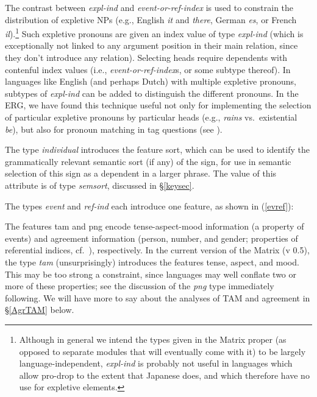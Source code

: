 \documentclass[12pt]{article}
\newcommand{\ees}{\eenumsentence}
\begin{document}
The contrast between {\it expl-ind} and {\it event-or-ref-index} is
used to constrain the distribution of expletive NPs (e.g., English
{\it it} and {\it there}, German {\it es}, or French {\it
il}).\footnote{Although in general we intend the types given in the
Matrix proper (as opposed to separate modules that will eventually
come with it) to be largely language-independent, 
{\it expl-ind} is probably not useful in languages
which allow pro-drop to the extent that Japanese does, and which therefore
have no use for expletive elements.}  Such expletive pronouns are given
an {\sc index} value of type {\it expl-ind} (which is exceptionally not
linked to any argument position in their main relation, since they
don't introduce any relation).  Selecting heads require dependents with
contenful {\sc index} values (i.e., {\it event-or-ref-index}s, or
some subtype thereof).  In languages like English (and perhaps Dutch) with
multiple expletive pronouns, subtypes of {\it expl-ind} can be added
to distinguish the different pronouns.  In the ERG, we have found
this technique useful not only for implementing the selection of 
particular expletive pronouns by particular heads (e.g., {\it rains} vs.\
existential {\it be}), but also for pronoun matching in tag questions
(see \citeboth{Ben:Fli:99}).

The type {\it individual} introduces the feature {\sc sort}, which can be
used to identify the grammatically relevant semantic sort (if any) of the
sign, for use in semantic selection of this sign as a dependent in a larger
phrase.  The value of this attribute is of type {\it semsort}, discussed
in \S\ref{keysec}.

The types {\it event} and {\it ref-ind} each introduce one feature,
as shown in (\ref{evref}):

\ees{\label{evref}
\item \begin{avm}
{\it event}: \[ tam & tam \]
\end{avm}

\item \begin{avm}
{\it ref-ind}: \[ png & png \]
\end{avm}
}
%
The features {\sc tam} and {\sc png} encode tense-aspect-mood
information (a property of events) and agreement information (person,
number, and gender; properties of referential indices, cf.\
), respectively.  In the current version of the
Matrix (v 0.5), the type {\it tam} (unsurprisingly) introduces the
features {\sc tense}, {\sc aspect}, and {\sc mood}.  This may be too
strong a constraint, since languages may well conflate two or more of
these properties; see the discussion of the {\it png} type immediately
following.  We will have more to say about the analyses of TAM and agreement in
\S\ref{AgrTAM} below.
\end{document}
